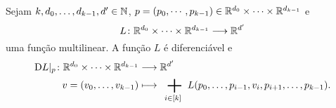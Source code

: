 \begin{proposition}
Sejam $k,d_0,\ldots,d_{k-1},d' \in \mathbb{N}$, $p=(p_0,\cdots,p_{k-1}) \in \mathbb{R}^{d_0} \times \cdots \times \mathbb{R}^{d_{k-1}}$ e
	\begin{equation*}
	{L}\colon {\mathbb{R}^{d_0} \times \cdots \times \mathbb{R}^{d_{k-1}}} \longrightarrow {\mathbb{R}^{d'}}
	\end{equation*}
uma função multilinear. A função $L$ é diferenciável e
	\begin{align*}
	\func{\D L|_p}{\R^{d_0} \times \cdots \times \R^{d_{k-1}}}{\R^{d'}}{v=(v_0,\ldots,v_{k-1})}{\sum_{i \in [k]} L(p_0,\ldots,p_{i-1},v_i,p_{i+1},\ldots,p_{k-1})}.
	\end{align*}
\end{proposition}
